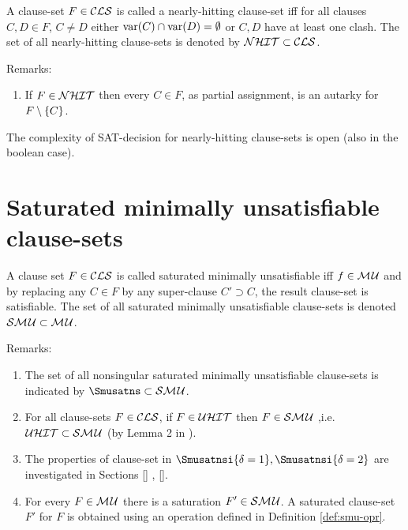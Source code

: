 \documentclass{report}
\begin{document}
 \begin{defi}\label{def:nhit-cls}
A clause-set $F \in \mathcal{CLS} $ is called a nearly-hitting clause-set iff for all clauses $C,D \in F$, $C \not = D$ either $\operatorname{var}(C) \cap \operatorname{var}(D) = \emptyset$ or $C,D$ have at least one clash. The set of all nearly-hitting clause-sets is denoted by $\mathcal{NHIT} \subset \mathcal{CLS}$.
\end{defi}
Remarks:
  \begin{enumerate}
  \item If $F \in \mathcal{NHIT}$ then every $C \in F$, as partial assignment, is an autarky for $F \setminus \{ C \}$.
  \end{enumerate}
  
\begin{quest}\label{ques:nhit-sat}
The complexity of SAT-decision for nearly-hitting clause-sets is open (also in the boolean case).
\end{quest}
   
\section{Saturated minimally unsatisfiable clause-sets}
\label{sec:smu}

\begin{defi}\label{def:smu}
A clause set $F \in \mathcal{CLS}$ is called saturated minimally unsatisfiable iff $f \in \mathcal{M\hspace{0.8pt}U} $ and by replacing any $C \in F$ by any super-clause $C' \supset C$, the result clause-set is satisfiable. The set of all saturated minimally unsatisfiable clause-sets is denoted $\mathcal{S}\mathcal{M\hspace{0.8pt}U} \subset \mathcal{M\hspace{0.8pt}U}$.
\end{defi}
Remarks:
  \begin{enumerate}
  \item The set of all nonsingular saturated minimally unsatisfiable clause-sets is indicated by $\Smusatns \subset \Smusat$.
  \item For all clause-sets $F \in \mathcal{CLS}$, if $F \in \mathcal{U}\mathcal{HIT}$ then $ F \in \mathcal{S}\mathcal{M\hspace{0.8pt}U}$ ,i.e. $\mathcal{U}\mathcal{HIT} \subset \mathcal{S}\mathcal{M\hspace{0.8pt}U}$ (by Lemma 2 in \cite{h29}). 
  \item The properties of clause-set in $\Smusatnsi{\delta=1}, \Smusatnsi{\delta=2}$ are investigated in Sections \ref{} , \ref{}.
  \item For every $F \in \mathcal{M\hspace{0.8pt}U}$ there is a saturation $F' \in \mathcal{S}\mathcal{M\hspace{0.8pt}U}$. A saturated clause-set  $F'$ for $F$ is obtained using an operation defined in Definition \ref{def:smu-opr}.
  \end{enumerate}
\end{document}
